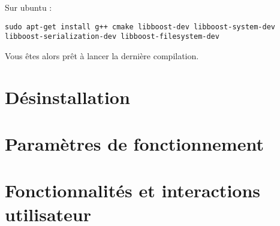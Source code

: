 \documentclass[a4paper,12pt]{article}
\begin{document}
  Sur ubuntu : 
    \begin{lstlisting}
sudo apt-get install g++ cmake libboost-dev libboost-system-dev libboost-serialization-dev libboost-filesystem-dev
    \end{lstlisting}
    
    Vous êtes alors prêt à lancer la dernière compilation.
    
  \section{Désinstallation}
  
 
  \section{Paramètres de fonctionnement}


  
  
  
  \section{Fonctionnalités et interactions utilisateur}

  
  



\end{document}
